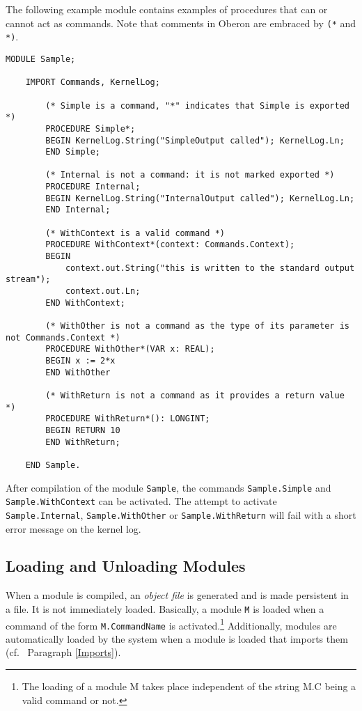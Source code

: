 \documentclass[a4wide,11pt]{article}
\begin{document}
The following example module contains examples of procedures that can or cannot act as commands. Note that comments in Oberon are embraced by \verb+(*+ and \verb+*)+.
\begin{lstlisting}[language=Oberon,frame=none,caption=Procedures and Commands]
    MODULE Sample;

    IMPORT Commands, KernelLog;

        (* Simple is a command, "*" indicates that Simple is exported *)
        PROCEDURE Simple*;
        BEGIN KernelLog.String("SimpleOutput called"); KernelLog.Ln;
        END Simple;

        (* Internal is not a command: it is not marked exported *)
        PROCEDURE Internal;
        BEGIN KernelLog.String("InternalOutput called"); KernelLog.Ln;
        END Internal;

        (* WithContext is a valid command *)
        PROCEDURE WithContext*(context: Commands.Context);
        BEGIN
            context.out.String("this is written to the standard output stream");
            context.out.Ln;
        END WithContext;

        (* WithOther is not a command as the type of its parameter is not Commands.Context *)
        PROCEDURE WithOther*(VAR x: REAL);
        BEGIN x := 2*x
        END WithOther

        (* WithReturn is not a command as it provides a return value *)
        PROCEDURE WithReturn*(): LONGINT;
        BEGIN RETURN 10
        END WithReturn;

    END Sample.
\end{lstlisting}

After compilation of the module \verb+Sample+, the commands \verb+Sample.Simple+ and \verb+Sample.WithContext+ can be activated. The attempt to activate \verb+Sample.Internal+, \verb+Sample.WithOther+ or \verb+Sample.WithReturn+ will fail with a short error message on the kernel log.

\subsection{Loading and Unloading Modules}
When a module is compiled, an {\em object file} is generated and is made persistent in a file. It is not immediately loaded.
Basically, a module \verb+M+ is loaded when a command of the form \verb+M.CommandName+ is activated.\footnote{The loading of a module M takes place independent of the string M.C being a valid command or not.} Additionally, modules are automatically loaded by the system when a module is loaded that imports them (cf.~ Paragraph \ref{Imports}).
\end{document}
